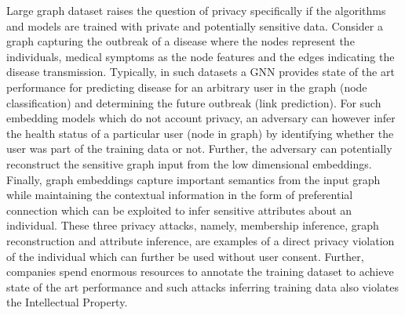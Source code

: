 Large graph dataset raises the question of privacy specifically if the algorithms and models are trained with private and potentially sensitive data.
Consider a graph capturing the outbreak of a disease where the nodes represent the individuals, medical symptoms as the node features and the edges indicating the disease transmission.
Typically, in such datasets a GNN provides state of the art performance for predicting disease for an arbitrary user in the graph (node classification) and determining the future outbreak (link prediction).
For such embedding models which do not account privacy, an adversary can however infer the health status of a particular user (node in graph) by identifying whether the user was part of the training data or not.
Further, the adversary can potentially reconstruct the sensitive graph input from the low dimensional embeddings. %
Finally, graph embeddings capture important semantics from the input graph while maintaining the contextual information in the form of preferential connection which can be exploited to infer sensitive attributes about an individual.
These three privacy attacks, namely, membership inference, graph reconstruction and attribute inference, are examples of a direct privacy violation of the individual which can further be used without user consent. %
Further, companies spend enormous resources to annotate the training dataset to achieve state of the art performance and such attacks inferring training data also violates the Intellectual Property.


